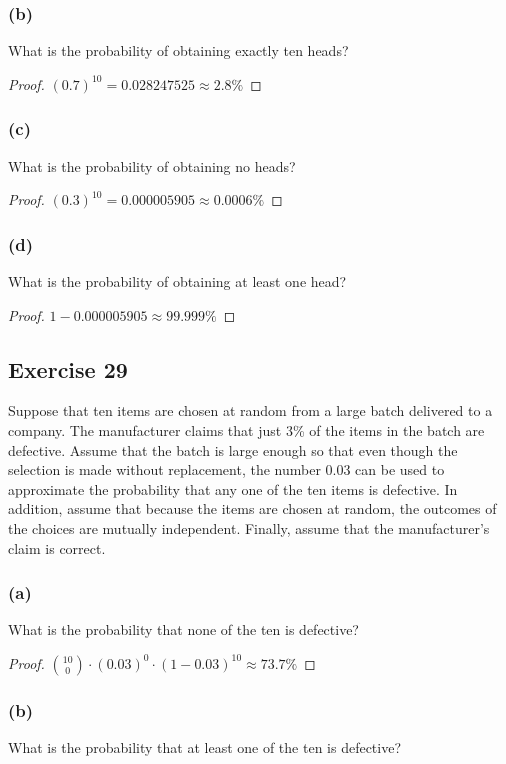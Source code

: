 \documentclass[14pt]{extarticle}
\begin{document}
\subsubsection{(b)}
What is the probability of obtaining exactly ten heads?
\begin{proof}
     \((0.7)^{10} = 0.028247525 \approx 2.8\%\)
\end{proof}

\subsubsection{(c)}
What is the probability of obtaining no heads?
\begin{proof}
     \((0.3)^{10} = 0.000005905 \approx 0.0006\%\)
\end{proof}

\subsubsection{(d)}
What is the probability of obtaining at least one head?
\begin{proof}
     \(1 - 0.000005905 \approx 99.999\%\)
\end{proof}

\subsection{Exercise 29}
Suppose that ten items are chosen at random from a large batch delivered to a company. The manufacturer claims that just 3\%
of the items in the batch are defective. Assume that the batch is large enough so that even though the selection is made
without replacement, the number 0.03 can be used to approximate the probability that any one of the ten items is
defective. In addition, assume that because the items are chosen at random, the outcomes of the choices are mutually
independent. Finally, assume that the manufacturer’s claim is correct.

\subsubsection{(a)}
What is the probability that none of the ten is defective?
\begin{proof}
     \(\binom{10}{0} \cdot (0.03)^0 \cdot (1 - 0.03)^{10} \approx 73.7\%\)
\end{proof}

\subsubsection{(b)}
What is the probability that at least one of the ten is defective?
\end{document}
